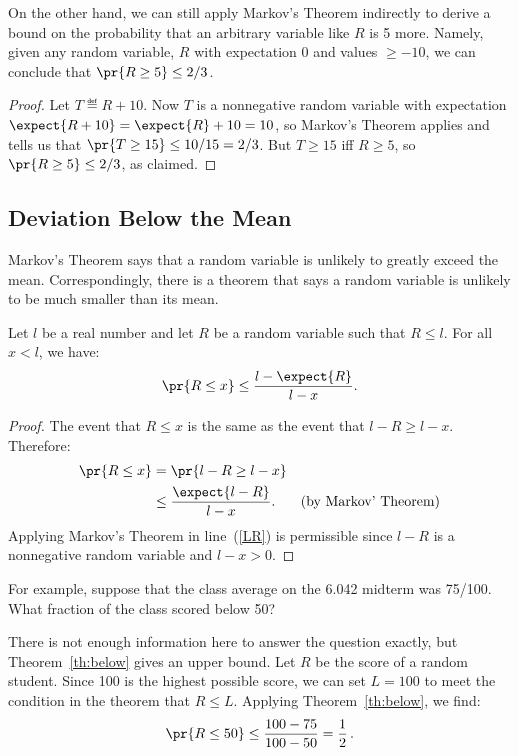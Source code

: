 On the other hand, we can still apply Markov's Theorem indirectly to
derive a bound on the probability that an arbitrary variable like $R$ is 5
more.  Namely, given any random variable, $R$ with expectation 0 and
values $\geq -10$, we can conclude that $\pr{R \geq 5} \le 2/3$.
\begin{proof}
Let $T \eqdef R+10$.  Now $T$ is a nonnegative random variable with
expectation $\expect{R + 10} = \expect{R}+10= 10$, so Markov's Theorem
applies and tells us that $\pr{T \geq 15} \le 10/15 = 2/3$.  But $T \geq
15$ iff $R \geq 5$, so $\pr{R \geq 5} \leq 2/3$, as claimed.
\end{proof}

\subsection{Deviation Below the Mean}

Markov's Theorem says that a random variable is unlikely to greatly exceed
the mean.  Correspondingly, there is a theorem that says a random variable
is unlikely to be much smaller than its mean.

\begin{theorem}
\label{th:below}
Let $l$ be a real number and let $R$ be a random variable such that $R
\leq l$.  For all $x < l$, we have:
\[
\pr{R \leq x} \leq \frac{l - \expect{R}}{l - x}.
\]
\end{theorem}

\begin{proof}
The event that $R \leq x$ is the same as the event that $l - R \geq l -
x$.  Therefore:
\begin{align}
\pr{R \leq x} &  = \pr{l - R \geq l - x}\notag\\
 & \leq \frac{\expect{l - R}}{l - x}. & \text{(by Markov' Theorem)}\label{LR}
\end{align}
Applying Markov's Theorem in line~(\ref{LR}) is permissible
since $l - R$ is a nonnegative random variable and $l - x > 0$.
\end{proof}

For example, suppose that the class average on the 6.042 midterm was
75/100.  What fraction of the class scored below 50?

There is not enough information here to answer the question exactly,
but Theorem~\ref{th:below} gives an upper bound.  Let $R$ be the score
of a random student.  Since 100 is the highest possible score, we
can set $L = 100$ to meet the condition in the theorem that $R \leq
L$.  Applying Theorem~\ref{th:below}, we find:
\begin{displaymath}
  \pr{R \leq 50} \leq \frac{100 - 75}{100 - 50} = \frac{1}{2}\,.
\end{displaymath}

